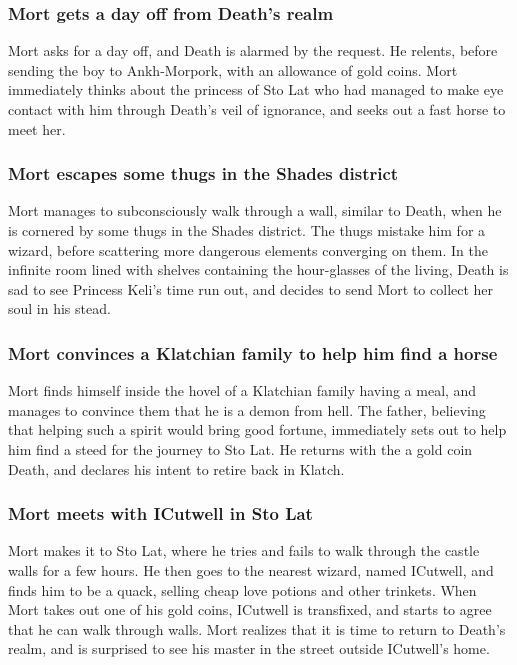 \subsubsection{\Gls{Mort} gets a day off from \Gls{Death}'s realm}
\Gls{Mort} asks for a day off, and \Gls{Death} is alarmed by the request. He relents, before sending
the boy to Ankh-Morpork, with an allowance of gold coins. \Gls{Mort} immediately thinks about the
princess of Sto Lat who had managed to make eye contact with him through \Gls{Death}'s veil of
ignorance, and seeks out a fast horse to meet her.

\subsubsection{\Gls{Mort} escapes some thugs in the Shades district}
\Gls{Mort} manages to subconsciously walk through a wall, similar to \Gls{Death}, when he is
cornered by some thugs in the Shades district. The thugs mistake him for a wizard, before scattering
more dangerous elements converging on them. In the infinite room lined with shelves containing the
hour-glasses of the living, \Gls{Death} is sad to see Princess \Gls{Keli}'s time run out, and
decides to send \Gls{Mort} to collect her soul in his stead.

\subsubsection{\Gls{Mort} convinces a Klatchian family to help him find a horse}
\Gls{Mort} finds himself inside the hovel of a Klatchian family having a meal, and manages to
convince them that he is a demon from hell. The father, believing that helping such a spirit would
bring good fortune, immediately sets out to help him find a steed for the journey to Sto Lat. He
returns with the a gold coin \Gls{Death}, and declares his intent to retire back in Klatch.

\subsubsection{\Gls{Mort} meets with \Gls{ICutwell} in Sto Lat}
\Gls{Mort} makes it to Sto Lat, where he tries and fails to walk through the castle walls for a few
hours. He then goes to the nearest wizard, named \Gls{ICutwell}, and finds him to be a quack,
selling cheap love potions and other trinkets. When \Gls{Mort} takes out one of his gold coins,
\Gls{ICutwell} is transfixed, and starts to agree that he can walk through walls. \Gls{Mort}
realizes that it is time to return to \Gls{Death}'s realm, and is surprised to see his master in
the street outside \Gls{ICutwell}'s home.

